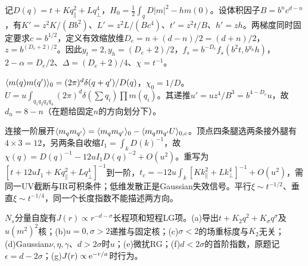 \begin{solution}
记$D(q)=t+Kq_\parallel^2+Lq_\perp^4$，$H_0=\tfrac12\int_qD|m|^2-hm(0)$。设体积因子$B=b^nc^{d-n}$，有$K'=z^2K/(Bb^2)$、$L'=z^2L/(Bc^4)$、$t'=z^2t/B$、$h'=zh$。两梯度同时固定要求$c=b^{1/2}$，定义有效缩放维$D_e=n+(d-n)/2=(d+n)/2$，$z=b^{(D_e+2)/2}$。因此$y_t=2,y_h=(D_e+2)/2$，$f_s=b^{-D_e}f_s(b^2t,b^{y_h}h)$，$2-\alpha=D_e/2$、$\Delta=(D_e+2)/4$、$\chi=t^{-1}$。

$\langle m(q)m(q')\rangle_0=(2\pi)^d\delta(q+q')/D(q)$，$\chi_0=1/D$。$U=u\int_{q_1q_2q_3q_4}(2\pi)^d\delta(\sum q_i)\prod m(q_i)$。其递推$u'=uz^4/B^3=b^{4-D_e}u$，故$d_u=8-n$（在题给固定$n$的方向划分下）。

连接一阶展开$\langle m_qm_{q'}\rangle=\langle m_qm_{q'}\rangle_0-\langle m_qm_{q'}U\rangle_{0,c}$。顶点四条腿选两条接外腿有$4\times3=12$，另两条自收缩$I_1=\int_kD(k)^{-1}$，故$\chi(q)=D(q)^{-1}-12uI_1D(q)^{-2}+O(u^2)$。重写为$[t+12uI_1+Kq_\parallel^2+Lq_\perp^4]^{-1}$到一阶，$t_c=-12u\int_k[Kk_\parallel^2+Lk_\perp^4]^{-1}+O(u^2)$，需同一UV截断与IR可积条件；低维发散正是Gaussian失效信号。平行$\xi\sim t^{-1/2}$、垂直$\xi\sim t^{-1/4}$，同一个长度指数不能描述两方向。
\end{solution}
\begin{exercise}[原题4(a)--(g)]\label{p:334-3-4}
$N_s$分量自旋有$J(r)\propto r^{-d-\sigma}$长程项和短程LG项。(a)导出$t+K_2q^2+K_\sigma q^\sigma$及$u(m^2)^2$核；(b)$u=0,\sigma>2$递推与固定核；(c)$\sigma<2$的场重标度与$K_2$无关；(d)Gaussian$\nu,\eta,\gamma$、$d>2\sigma$时$u$；(e)微扰RG；(f)$d<2\sigma$的首阶指数，原题记$\epsilon=d-2\sigma$；(g)$J(r)\propto\mathrm e^{-r/a}$时行为。
\end{exercise}

